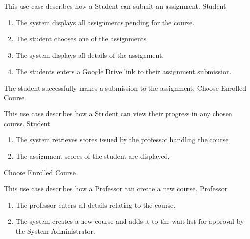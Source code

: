 \documentclass[12pt, a4]{report}
\begin{document}

\newpage
{}
{ %
This use case describes how a Student can submit an assignment.
}
{ %
Student
}
{ %
\begin{enumerate}
    \item The system displays all assignments pending for the course.
    \item The student chooses one of the assignments.
    \item The system displays all details of the assignment.
    \item The students enters a Google Drive link to their assignment submission.
\end{enumerate}
}
{ %
}
{ %
}
{ %
The student successfully makes a submission to the assignment.
}
{ %
Choose Enrolled Course
}
{ %
}


{ %
This use case describes how a Student can view their progress in any chosen course.
}
{ %
Student
}
{ %
\begin{enumerate}
    \item The system retrieves scores issued by the professor handling the course.
    \item The assignment scores of the student are displayed.
\end{enumerate}
}
{ %
}
{ %
}
{ %
}
{ %
Choose Enrolled Course
}
{ %
}


{ %
This use case describes how a Professor can create a new course.
}
{ %
Professor
}
{ %
\begin{enumerate}
    \item The professor enters all details relating to the course.
    \item The system creates a new course and adds it to the wait-list for approval by the System Administrator.
\end{enumerate}
}
{ %
}
{ %
}
{ %
}
{ %
}
{ %
}
\end{document}
